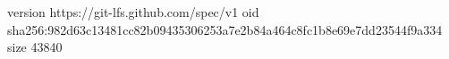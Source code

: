 version https://git-lfs.github.com/spec/v1
oid sha256:982d63c13481cc82b09435306253a7e2b84a464c8fc1b8e69e7dd23544f9a334
size 43840
